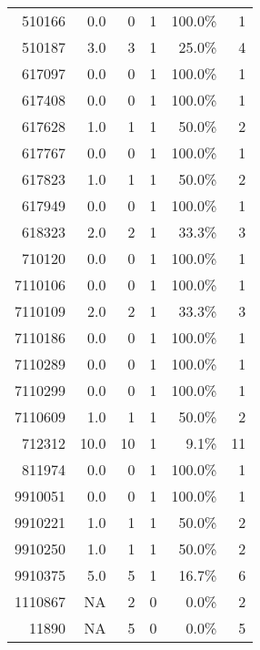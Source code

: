 \begin{longtable}{lrrrrr}
	\multicolumn{1}{r}{510166} & 0.0   & 0     & 1     & 100.0\% & 1 \\
	\multicolumn{1}{r}{510187} & 3.0   & 3     & 1     & 25.0\% & 4 \\
	\multicolumn{1}{r}{617097} & 0.0   & 0     & 1     & 100.0\% & 1 \\
	\multicolumn{1}{r}{617408} & 0.0   & 0     & 1     & 100.0\% & 1 \\
	\multicolumn{1}{r}{617628} & 1.0   & 1     & 1     & 50.0\% & 2 \\
	\multicolumn{1}{r}{617767} & 0.0   & 0     & 1     & 100.0\% & 1 \\
	\multicolumn{1}{r}{617823} & 1.0   & 1     & 1     & 50.0\% & 2 \\
	\multicolumn{1}{r}{617949} & 0.0   & 0     & 1     & 100.0\% & 1 \\
	\multicolumn{1}{r}{618323} & 2.0   & 2     & 1     & 33.3\% & 3 \\
	\multicolumn{1}{r}{710120} & 0.0   & 0     & 1     & 100.0\% & 1 \\
	\multicolumn{1}{r}{7110106} & 0.0   & 0     & 1     & 100.0\% & 1 \\
	\multicolumn{1}{r}{7110109} & 2.0   & 2     & 1     & 33.3\% & 3 \\
	\multicolumn{1}{r}{7110186} & 0.0   & 0     & 1     & 100.0\% & 1 \\
	\multicolumn{1}{r}{7110289} & 0.0   & 0     & 1     & 100.0\% & 1 \\
	\multicolumn{1}{r}{7110299} & 0.0   & 0     & 1     & 100.0\% & 1 \\
	\multicolumn{1}{r}{7110609} & 1.0   & 1     & 1     & 50.0\% & 2 \\
	\multicolumn{1}{r}{712312} & 10.0  & 10    & 1     & 9.1\% & 11 \\
	\multicolumn{1}{r}{811974} & 0.0   & 0     & 1     & 100.0\% & 1 \\
	\multicolumn{1}{r}{9910051} & 0.0   & 0     & 1     & 100.0\% & 1 \\
	\multicolumn{1}{r}{9910221} & 1.0   & 1     & 1     & 50.0\% & 2 \\
	\multicolumn{1}{r}{9910250} & 1.0   & 1     & 1     & 50.0\% & 2 \\
	\multicolumn{1}{r}{9910375} & 5.0   & 5     & 1     & 16.7\% & 6 \\
	\multicolumn{1}{r}{1110867} & NA    & 2     & 0     & 0.0\% & 2 \\
	\multicolumn{1}{r}{11890} & NA    & 5     & 0     & 0.0\% & 5 \\

\end{longtable}
